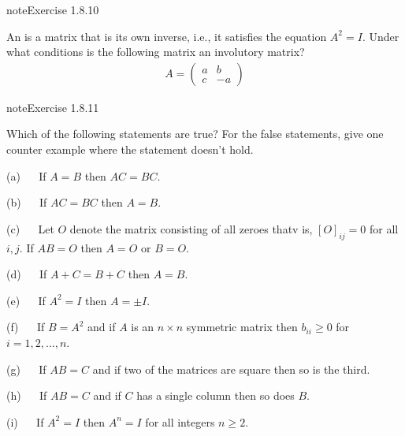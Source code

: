 \documentclass[letterpaper,10pt,english]{jupyterBook}
\begin{document}
\begin{sphinxadmonition}{note}{Exercise 1.8.10}



\sphinxAtStartPar
An  is a matrix that is its own inverse, i.e., it satisfies the equation \(A^2 = I\). Under what conditions is the following matrix an involutory matrix?
\begin{equation*}
\begin{split}A = \begin{pmatrix} a & b \\ c & -a \end{pmatrix} \end{split}
\end{equation*}\end{sphinxadmonition}
 \label{exercise:matrices-ex-trueorfalse}

\begin{sphinxadmonition}{note}{Exercise 1.8.11}



\sphinxAtStartPar
Which of the following statements are true? For the false statements, give one counter example where the statement doesn’t hold.

\sphinxAtStartPar
(a)   If \(A = B\) then \(AC = BC\).

\sphinxAtStartPar
(b)   If \(AC = BC\) then \(A = B\).

\sphinxAtStartPar
(c)   Let \(O\) denote the matrix consisting of all zeroes \sphinxhyphen{} thatv is, \([O]_{ij} = 0\) for all \(i,j\). If \(AB = O\) then \(A = O\) or \(B = O\).

\sphinxAtStartPar
(d)   If \(A + C = B + C\) then \(A = B\).

\sphinxAtStartPar
(e)   If \(A^2 = I\) then \(A = \pm I\).

\sphinxAtStartPar
(f)   If \(B = A^2\) and if \(A\) is an \(n \times n\) symmetric matrix then \(b_{ii} \geq 0\) for \(i = 1, 2, \ldots, n\).

\sphinxAtStartPar
(g)   If \(AB = C\) and if two of the matrices are square then so is the third.

\sphinxAtStartPar
(h)   If \(AB = C\) and if \(C\) has a single column then so does \(B\).

\sphinxAtStartPar
(i)   If \(A^2 = I\) then \(A^n = I\) for all integers \(n \geq 2\).
\end{sphinxadmonition}
 \label{exercise:matrices-ex7}
\end{document}
